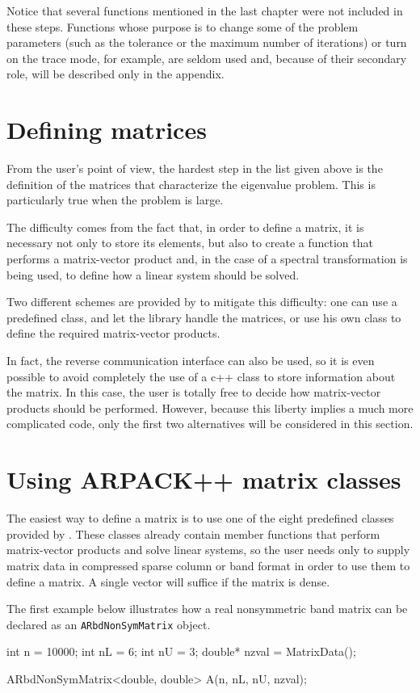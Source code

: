 Notice that several functions mentioned in the last chapter were not included in these steps. Functions whose purpose is to change some of the problem parameters (such as the tolerance or the maximum number of iterations) or turn on the trace mode, for example, are seldom used and, because of their secondary role, will be described only in the appendix.

\section{Defining matrices}

From the user’s point of view, the hardest step in the list given above is the definition of the matrices that characterize the eigenvalue problem. This is particularly true when the problem is large.

The difficulty comes from the fact that, in order to define a matrix, it is necessary not only to store its elements, but also to create a function that performs a matrix-vector product and, in the case of a spectral transformation is being used, to define how a linear system should be solved.

Two different schemes are provided by \ARPP{} to mitigate this difficulty: one can use a predefined class, and let the library handle the matrices, or use his own class to define the required matrix-vector products.

In fact, the reverse communication interface can also be used, so it is even possible to avoid completely the use of a c++ class to store information about the matrix. In this case, the user is totally free to decide how matrix-vector products should be performed. However, because this liberty implies a much more complicated code, only the first two alternatives will be considered in this section.

\section{Using ARPACK++ matrix classes}

The easiest way to define a matrix is to use one of the eight predefined classes provided by \ARPP{}. These classes already contain member functions that perform matrix-vector products and solve linear systems, so the user needs only to supply matrix data in compressed sparse column or band format in order to use them to define a matrix. A single vector will suffice if the matrix is dense.

The first example below illustrates how a real nonsymmetric band matrix can be declared as an \texttt{ARbdNonSymMatrix} object.
\begin{cppcode}
int     n     = 10000;
int     nL    = 6;
int     nU    = 3;
double* nzval = MatrixData();

ARbdNonSymMatrix<double, double> A(n, nL, nU, nzval);
\end{cppcode}

